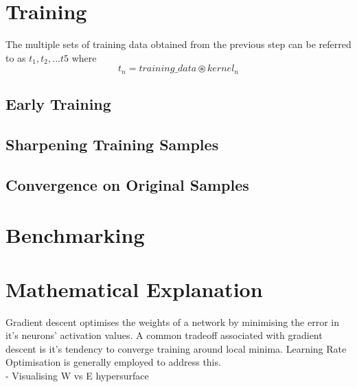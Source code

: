 \documentclass[12pt]{article}
\begin{document}
\begin{multicols}{2}
		\section{Training}
		The multiple sets of training data obtained from the previous step can be referred to as $t_{1},t_{2},...t{5}$ where 
		$$t_{n} = training\_data \circledast kernel_{n} $$

			\subsection{Early Training}
			\subsection{Sharpening Training Samples}
			\subsection{Convergence on Original Samples}
			
		\section{Benchmarking}
		
		\section{Mathematical Explanation}
		Gradient descent optimises the weights of a network by minimising the error in it's neurons' activation values. A common tradeoff associated with gradient descent is it's tendency to converge training around local minima. Learning Rate Optimisation is generally employed to address this.
		\\
		- Visualising W vs E hypersurface
		
	\end{multicols}

	\begin{multicols}{2}
		
	\end{multicols}
	
	
	
	
	
\end{document}
